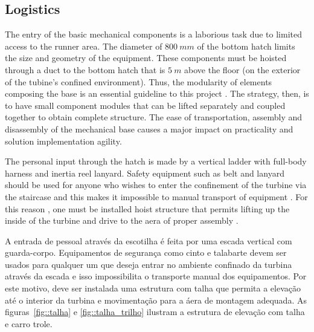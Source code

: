 \subsection{Logistics}

The entry of the basic mechanical components is a laborious task due to limited
access to the runner area. The diameter of  $ 800~mm $ of the bottom hatch
limits the size and geometry of the equipment.
These components must be hoisted through a duct to the bottom hatch that is $
5~m $ above the floor (on the exterior of the tubine's confined environment).
Thus, the modularity of elements composing the base is an essential guideline
to this project . The strategy, then, is to have small component modules that
can be lifted separately and coupled together to obtain complete structure.
The ease of transportation, assembly and disassembly of the mechanical base
causes a major impact on practicality and solution implementation agility.

% 
% 


The personal input through the hatch is made by a vertical ladder
with  full-body harness and inertia reel lanyard.
Safety equipment such as belt and lanyard should be used for anyone who wishes to enter the
confinement of the turbine via the staircase and this makes it impossible to
manual transport of equipment . For this reason , one must be installed
hoist structure that permits lifting up the inside of the turbine and
drive to the aera of proper assembly .


A entrada de pessoal através da escotilha é feita por uma escada vertical com
guarda-corpo. Equipamentos de segurança como
cinto e talabarte devem ser usados para qualquer um que deseja entrar no
ambiente confinado da turbina através da escada e isso impossibilita o
transporte manual dos equipamentos. Por este motivo, deve ser instalada uma
estrutura com talha que permita a elevação até o interior da turbina e
movimentação para a áera de montagem adequada. As figuras~\ref{fig::talha} e
\ref{fig::talha_trilho} ilustram a estrutura de elevação com talha e carro
trole. 
  
